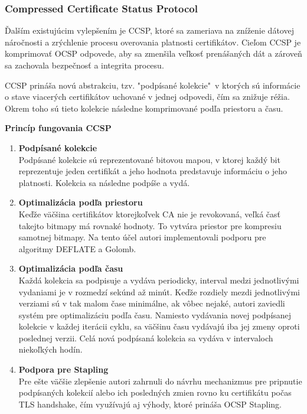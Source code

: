 \documentclass[12pt, twoside]{book}
\newcommand{\subsubsubsection}[1]{%
  \vspace{0.2em}  
  \textbf{#1} \\[0.2em]
  \hspace*{\parindent}
}
\begin{document}
\subsubsection{Compressed Certificate Status Protocol}
Ďalším existujúcim vylepšením je CCSP, ktoré sa zameriava na zníženie dátovej náročnosti a zrýchlenie procesu overovania platnosti certifikátov. Cieľom CCSP je komprimovať OCSP odpovede, aby sa zmenšila veľkosť prenášaných dát a zároveň sa zachovala bezpečnosť a integrita procesu.

CCSP prináša novú abstrakciu, tzv. "podpísané kolekcie"\, v ktorých sú informácie o stave viacerých certifikátov uchované v jednej odpovedi, čím sa znižuje réžia. Okrem toho sú tieto kolekcie následne komprimované podľa priestoru a času.\cite{ccsp}

\subsubsubsection{Princíp fungovania CCSP}

\begin{enumerate} 
\item \textbf{Podpísané kolekcie} \\
Podpísané kolekcie sú reprezentované bitovou mapou, v ktorej každý bit reprezentuje jeden certifikát a jeho hodnota predstavuje informáciu o jeho platnosti. Kolekcia sa následne podpíše a vydá.\cite{ccsp}


\item \textbf{Optimalizácia podľa priestoru} \\
Keďže väčšina certifikátov ktorejkoľvek CA nie je revokovaná,\cite{ccsp} veľká časť takejto bitmapy má rovnaké hodnoty. To vytvára priestor pre kompresiu samotnej bitmapy. Na tento účel autori implementovali podporu pre algoritmy DEFLATE a Golomb.\cite{ccsp}

\item \textbf{Optimalizácia podľa času} \\
Každá kolekcia sa podpisuje a vydáva periodicky, interval medzi jednotlivými vydaniami je v rozmedzí sekúnd až minút. Keďže rozdiely mezdi jednotlivými verziami sú v tak malom čase minimálne, ak vôbec nejaké, autori zaviedli systém pre optimalizáciu podľa času. Namiesto vydávania novej podpísanej kolekcie v každej iterácii cyklu,  sa väčšinu času vydávajú iba jej zmeny oproti poslednej verzii. Celá nová podpísaná kolekcia sa vydáva v intervaloch niekoľkých hodín.\cite{ccsp}

\item \textbf{Podpora pre Stapling} \\
Pre ešte väčšie zlepšenie autori zahrnuli do návrhu mechanizmus pre pripnutie podpísaných kolekcií alebo ich posledných zmien rovno ku certifikátu počas TLS handshake, čím využívajú aj výhody, ktoré prináša OCSP Stapling.\cite{ccsp}
\end{enumerate}
\end{document}
